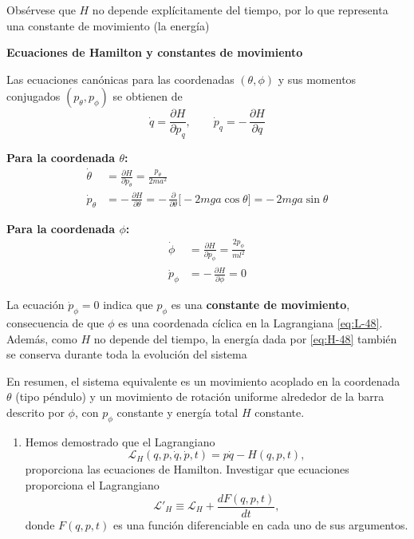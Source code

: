 \documentclass{article}
\newenvironment{AGbox}[1][7]%
{%
  \begin{tcolorbox}[
    enhanced, breakable,
    colframe=AppleGreen,
    colback=AppleGreen!#1,
    boxrule=1pt,
    borderline west={2mm}{-10mm}{AppleGreen},
    sharp corners=southwest,
    left=14pt,right=14pt,top=10pt,bottom=10pt,
     boxsep=6pt,
  ]%
}{%
  \end{tcolorbox}%
}
\begin{document}
Obsérvese que $H$ no depende explícitamente del tiempo, por lo que representa
una constante de movimiento (la energía)

\textcolor{trueblue}{\textbf{Ecuaciones de Hamilton y constantes de movimiento}}

Las ecuaciones canónicas para las coordenadas $(\theta,\phi)$ y sus momentos
conjugados $(p_{\theta},p_{\phi})$ se obtienen de
\[
\dot q = \frac{\partial H}{\partial p_{q}},
\qquad
\dot p_{q} = -\,\frac{\partial H}{\partial q}
\]

\medskip
\textbf{Para la coordenada $\theta$:}
\begin{equation}
\begin{split}
\dot\theta
&= \frac{\partial H}{\partial p_{\theta}}
 = \frac{p_{\theta}}{2 m a^{2}} \\[6pt]
\dot p_{\theta}
&= -\,\frac{\partial H}{\partial\theta}
 = -\,\frac{\partial}{\partial\theta}
    \bigl[-2 m g a\cos\theta\bigr]
 = -\,2 m g a\sin\theta
\end{split}
\label{eq:Ham-theta-48}
\end{equation}

\textbf{Para la coordenada $\phi$:}
\begin{equation}
\begin{split}
\dot\phi
&= \frac{\partial H}{\partial p_{\phi}}
 = \frac{2 p_{\phi}}{m l^{2}} \\[6pt]
\dot p_{\phi}
&= -\,\frac{\partial H}{\partial\phi}
 = 0
\end{split}
\label{eq:Ham-phi-48}
\end{equation}

La ecuación $\dot p_{\phi} = 0$ indica que $p_{\phi}$ es una
\textbf{constante de movimiento}, consecuencia de que $\phi$ es una coordenada
cíclica en la Lagrangiana \eqref{eq:L-48}. Además, como $H$ no depende del
tiempo, la energía dada por \eqref{eq:H-48} también se conserva durante toda
la evolución del sistema

\medskip
En resumen, el sistema equivalente es un movimiento acoplado en la coordenada
$\theta$ (tipo péndulo) y un movimiento de rotación uniforme alrededor de la
barra descrito por $\phi$, con $p_{\phi}$ constante y energía total $H$
constante. \vspace{0.5cm}



\begin{AGbox}[8]
\begin{enumerate}[label={{\textcolor{trueblue}{\textbf{Pr.} 4.9}}}]
  \item Hemos demostrado que el Lagrangiano
  \[
  \mathcal{L}_{H}(q,p,\dot{q},\dot{p},t)=p\dot{q}-H(q,p,t),
  \]
  proporciona las ecuaciones de Hamilton. Investigar que ecuaciones proporciona el Lagrangiano
  \[
  \mathcal{L}'_{H}\equiv \mathcal{L}_{H}+\frac{dF(q,p,t)}{dt},
  \]
  donde $F(q,p,t)$ es una función diferenciable en cada uno de sus argumentos.
\end{enumerate}
\end{AGbox}
\vspace{0.5cm}
\end{document}
